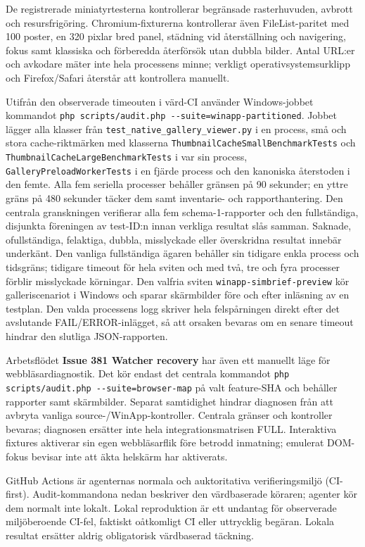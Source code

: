 \documentclass[11pt,a4paper]{article}
\newcommand{\ui}[1]{\textbf{#1}}
\newcommand{\codeword}[1]{\nolinkurl{#1}}
\begin{document}
De registrerade miniatyrtesterna kontrollerar begränsade rasterhuvuden, avbrott
och resursfrigöring. Chromium-fixturerna kontrollerar även FileList-paritet med
100 poster, en 320 pixlar bred panel, städning vid återställning och navigering,
fokus samt klassiska och förberedda återförsök utan dubbla bilder. Antal URL:er
och avkodare mäter inte hela processens minne; verkligt operativsystemsurklipp
och Firefox/Safari återstår att kontrollera manuellt.

Utifrån den observerade timeouten i värd-CI använder Windows-jobbet kommandot
\codeword{php scripts/audit.php --suite=winapp-partitioned}. Jobbet lägger alla
klasser från \codeword{test_native_gallery_viewer.py} i en process, små och stora
cache-riktmärken med klasserna \codeword{ThumbnailCacheSmallBenchmarkTests}
och \codeword{ThumbnailCacheLargeBenchmarkTests} i var sin process,
\codeword{GalleryPreloadWorkerTests} i en fjärde process och den kanoniska
återstoden i den femte. Alla fem seriella processer behåller gränsen
på 90 sekunder; en yttre gräns på 480 sekunder täcker dem samt
inventarie- och rapporthantering. Den centrala granskningen verifierar
alla fem schema-1-rapporter och den
fullständiga, disjunkta föreningen av test-ID:n innan verkliga resultat slås
samman. Saknade, ofullständiga, felaktiga, dubbla, misslyckade eller
överskridna resultat innebär underkänt. Den vanliga fullständiga ägaren behåller
sin tidigare enkla process och tidsgräns; tidigare timeout för hela sviten och
med två, tre och fyra processer förblir misslyckade körningar.
Den valfria sviten \codeword{winapp-simbrief-preview} kör galleriscenariot i
Windows och sparar skärmbilder före och efter inläsning av en testplan.
Den valda processens logg skriver hela felspårningen direkt efter det avslutande
FAIL/ERROR-inlägget, så att orsaken bevaras om en senare timeout hindrar den
slutliga JSON-rapporten.

Arbetsflödet \ui{Issue 381 Watcher recovery} har även ett manuellt läge för
webbläsardiagnostik. Det kör endast det centrala kommandot
\codeword{php scripts/audit.php --suite=browser-map} på valt feature-SHA
och behåller rapporter samt skärmbilder. Separat samtidighet hindrar diagnosen
från att avbryta vanliga source-/WinApp-kontroller. Centrala gränser och
kontroller bevaras; diagnosen ersätter inte hela integrationsmatrisen FULL.
Interaktiva fixtures aktiverar sin egen webbläsarflik före betrodd inmatning;
emulerat DOM-fokus bevisar inte att äkta helskärm har aktiverats.

GitHub Actions är agenternas normala och auktoritativa verifieringsmiljö
(CI-first). Audit-kommandona nedan beskriver den värdbaserade köraren; agenter
kör dem normalt inte lokalt. Lokal reproduktion är ett undantag för observerade
miljöberoende CI-fel, faktiskt oåtkomligt CI eller uttrycklig begäran. Lokala
resultat ersätter aldrig obligatorisk värdbaserad täckning.
\end{document}
